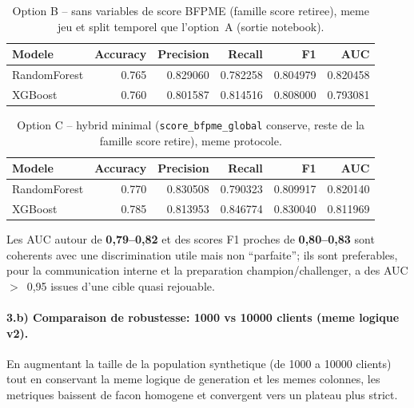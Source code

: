 \documentclass[11pt,a4paper]{article}
\begin{document}
\begin{table}[h]
  \centering
  \caption{Option B -- sans variables de score BFPME (famille score retiree), meme jeu et split temporel que l'option~A (sortie notebook).}
  \begin{tabular}{lrrrrr}
    \toprule
    Modele & Accuracy & Precision & Recall & F1 & AUC \\
    \midrule
    RandomForest & 0.765 & 0.829060 & 0.782258 & 0.804979 & 0.820458 \\
    XGBoost      & 0.760 & 0.801587 & 0.814516 & 0.808000 & 0.793081 \\
    \bottomrule
  \end{tabular}
\end{table}

\begin{table}[h]
  \centering
  \caption{Option C -- hybrid minimal (\texttt{score\_bfpme\_global} conserve, reste de la famille score retire), meme protocole.}
  \begin{tabular}{lrrrrr}
    \toprule
    Modele & Accuracy & Precision & Recall & F1 & AUC \\
    \midrule
    RandomForest & 0.770 & 0.830508 & 0.790323 & 0.809917 & 0.820140 \\
    XGBoost      & 0.785 & 0.813953 & 0.846774 & 0.830040 & 0.811969 \\
    \bottomrule
  \end{tabular}
\end{table}

Les AUC autour de \textbf{0,79--0,82} et des scores F1 proches de \textbf{0,80--0,83} sont coherents avec une discrimination utile mais non ``parfaite''; ils sont preferables, pour la communication interne et la preparation champion/challenger, a des AUC $>$~0,95 issues d'une cible quasi rejouable.

\paragraph{3.b) Comparaison de robustesse: 1000 vs 10000 clients (meme logique v2).}
En augmentant la taille de la population synthetique (de 1000 a 10000 clients) tout en conservant la meme logique de generation et les memes colonnes, les metriques baissent de facon homogene et convergent vers un plateau plus strict.
\end{document}
